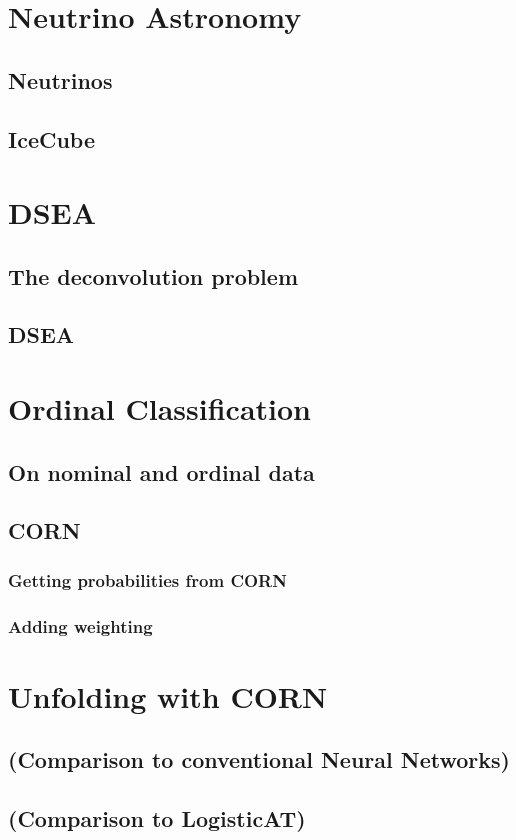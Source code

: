 
\chapter{Neutrino Astronomy}
     \section{Neutrinos}
     \section{IceCube}
\chapter{DSEA}
     \section{The deconvolution problem}
     \section{DSEA} %
\chapter{Ordinal Classification}
     \section{On nominal and ordinal data}
     \section{CORN}
          \subsection{Getting probabilities from CORN} %
          \subsection{Adding weighting}
\chapter{Unfolding with CORN}
    
    
    \section{(Comparison to conventional Neural Networks)}
    \section{(Comparison to LogisticAT)}

